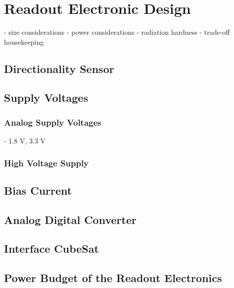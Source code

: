 \section{Readout Electronic Design}
\label{sec:electronic_design}
- size considerations
- power considerations
- radiation hardness
- trade-off housekeeping

\subsection{Directionality Sensor}
\label{sec:directionality Sensor}


\subsection{Supply Voltages}
\label{sec:power_supplies}

\subsubsection{Analog Supply Voltages}
\label{sec:analog_supply}
- 1.8 V, 3.3 V

\subsubsection{High Voltage Supply}
\label{sec:hv_supply}


\subsection{Bias Current}
\label{sec:bias_current}


\subsection{Analog Digital Converter}
\label{sec:adc}


\subsection{Interface CubeSat}
\label{sec:interface_cubesat}


\subsection{Power Budget of the Readout Electronics}
\label{sec:power_budget}
